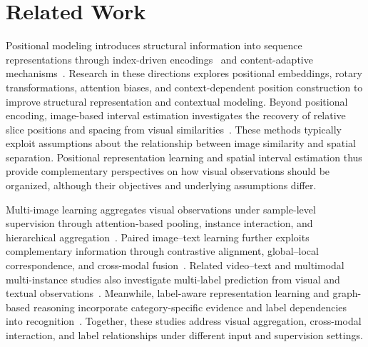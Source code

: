 \section{Related Work}
\label{sec:related_work}


Positional modeling introduces structural information into sequence representations through index-driven encodings~\cite{vaswani2017attention,shaw2018relative,su2021roformer,press2022alibi} and content-adaptive mechanisms~\cite{golovneva2024cope,yang2025path,zheng2024dape,zheng2025dapev2}. Research in these directions explores positional embeddings, rotary transformations, attention biases, and context-dependent position construction to improve structural representation and contextual modeling. Beyond positional encoding, image-based interval estimation investigates the recovery of relative slice positions and spacing from visual similarities~\cite{su2025ctslice,tang2021bodypart}. These methods typically exploit assumptions about the relationship between image similarity and spatial separation. Positional representation learning and spatial interval estimation thus provide complementary perspectives on how visual observations should be organized, although their objectives and underlying assumptions differ.


Multi-image learning aggregates visual observations under sample-level supervision through attention-based pooling, instance interaction, and hierarchical aggregation~\cite{ilse2018attention,lu2021clam,li2021dsmil,shao2021transmil,zhang2022dtfd}. Paired image--text learning further exploits complementary information through contrastive alignment, global--local correspondence, and cross-modal fusion~\cite{li2021albef,li2022blip,zhang2022convirt,huang2021gloria,zhou2022refers,zhong2026mmtf}. Related video--text and multimodal multi-instance studies also investigate multi-label prediction from visual and textual observations~\cite{li2022mallcnn,yang2018m3dn}. Meanwhile, label-aware representation learning and graph-based reasoning incorporate category-specific evidence and label dependencies into recognition~\cite{ridnik2021asymmetric,chen2019mlgcn,feng2019hypergraph,zhu2025mambaml}. Together, these studies address visual aggregation, cross-modal interaction, and label relationships under different input and supervision settings.

